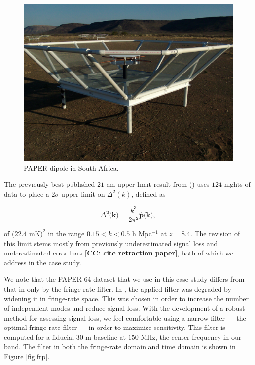 \documentclass[preprint2,numberedappendix,tighten]{aastex6}  %
\newcommand{\cc}[1]{{\color{purple} \textbf{[CC: #1]}}}
\begin{document}
\begin{figure}
	\centering
	\includegraphics[trim={0.3cm 0.3cm 0.3cm 0.3cm},width=\columnwidth]{plots/paper_dipole.png}
	\caption{PAPER dipole in South Africa.}
	\label{fig:paper}
\end{figure}


The previously best published $21$ cm upper limit result from (\citealt{ali_et_al2015}) uses $124$ nights of data to place a $2\sigma$ upper limit on $\Delta^{2}(k)$, defined as

\begin{equation}
\Delta^{\textbf{2}}\textbf{(k)} = \frac{k^{3}}{2\pi^{2}}\hat{\textbf{p}}\textbf{(k)},
\end{equation}

\noindent of $(22.4$ mK$)^{2}$ in the range $0.15 < k < 0.5$ h Mpc$^{-1}$ at $z = 8.4$. The revision of this limit stems mostly from previously underestimated signal loss and underestimated error bars \cc{cite retraction paper}, both of which we address in the case study. 

We note that the PAPER-64 dataset that we use in this case study differs from that in \citet{ali_et_al2015} only by the fringe-rate filter. In \citet{ali_et_al2015}, the applied filter was degraded by widening it in fringe-rate space. This was chosen in order to increase the number of independent modes and reduce signal loss. With the development of a robust method for assessing signal loss, we feel comfortable using a narrow filter --- the optimal fringe-rate filter --- in order to maximize sensitivity. This filter is computed for a fiducial $30$ m baseline at $150$ MHz, the center frequency in our band. The filter in both the fringe-rate domain and time domain is shown in Figure \ref{fig:frp}.
\end{document}
